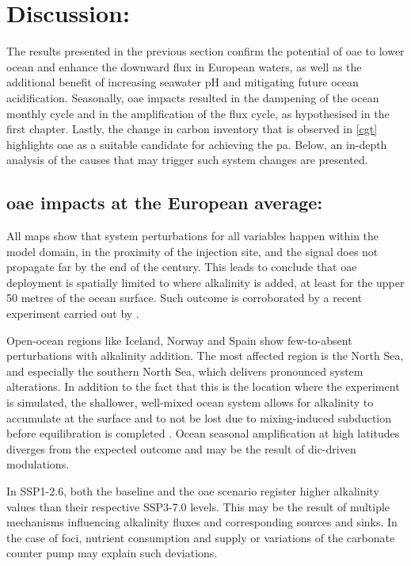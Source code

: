 \chapter{Discussion:}

The results presented in the previous section confirm the potential of \ac{oae} to lower ocean  and enhance the downward  flux in European waters, as well as the additional benefit of increasing seawater pH and mitigating future ocean acidification. Seasonally, \ac{oae} impacts resulted in the dampening of the ocean  monthly cycle and in the amplification of the  flux cycle, as hypothesised in the first chapter. Lastly, the change in carbon inventory that is observed in \cref{cgt} highlights \ac{oae} as a suitable candidate for achieving the \ac{pa}. Below, an in-depth analysis of the causes that may trigger such system changes are presented. 

\section[\texorpdfstring{OAE}{OAE} impacts at the European average:]{\ac{oae} impacts at the European average:}

All maps show that system perturbations for all variables happen within the model domain, in the proximity of the injection site, and the signal does not propagate far by the end of the century. This leads to conclude that \ac{oae} deployment is spatially limited to where alkalinity is added, at least for the upper 50 metres of the ocean surface. Such outcome is corroborated by a recent experiment carried out by \cite{wang2023simulated}. 

Open-ocean regions like Iceland, Norway and Spain show few-to-absent perturbations with alkalinity addition. The most affected region is the North Sea, and especially the southern North Sea, which delivers pronounced system alterations. In addition to the fact that this is the location where the experiment is simulated, the shallower, well-mixed ocean system allows for alkalinity to accumulate at the surface and to not be lost due to mixing-induced subduction before equilibration is completed \citep{wang2023simulated}. Ocean  seasonal amplification at high latitudes diverges from the expected outcome and may be the result of \ac{dic}-driven modulations. 

In SSP1-2.6, both the baseline and the \ac{oae} scenario register higher alkalinity values than their respective SSP3-7.0 levels. This may be the result of multiple mechanisms influencing alkalinity fluxes and corresponding sources and sinks. In the case of \ac{foci}, nutrient consumption and supply or variations of the carbonate counter pump may explain such deviations. 

